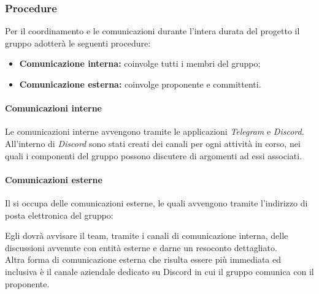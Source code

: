 \subsubsection {Procedure}
Per il coordinamento e le comunicazioni durante l'intera durata del progetto il gruppo \groupName{} adotterà le seguenti procedure:
\begin{itemize}
  \item \textbf{Comunicazione interna:} coinvolge tutti i membri del gruppo;
  \item  \textbf{Comunicazione esterna:} coinvolge proponente e committenti.
\end{itemize}
\paragraph{Comunicazioni interne}
Le comunicazioni interne avvengono tramite le applicazioni \textit{Telegram}\glo{} e \textit{Discord}\glo{}. All'interno di \textit{Discord}\glo{} sono stati creati dei canali per ogni attività in corso, nei quali i componenti del gruppo possono discutere di argomenti ad essi associati.
\paragraph{Comunicazioni esterne}
Il \roleProjectManagerLow{} si occupa delle comunicazioni esterne, le quali avvengono tramite l'indirizzo di posta elettronica del gruppo:
\begin{center}
  \groupEmail{}
\end{center}
Egli dovrà avvisare il team, tramite i canali di comunicazione interna, delle discussioni avvenute con entità esterne e darne un resoconto dettagliato.\\
Altra forma di comunicazione esterna che risulta essere più immediata ed inclusiva è il canale aziendale dedicato su Discord\glo{} in cui il gruppo \groupName{} comunica con il proponente.



